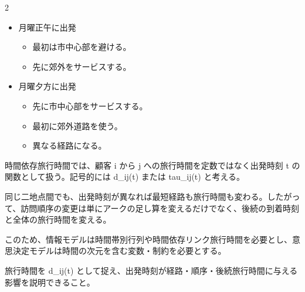 

\vspace{1.5mm}

\begin{multicols}{2}

\footnotesize

\raggedcolumns


\begin{itemize}
\item 月曜正午に出発
\begin{itemize}
\item 最初は市中心部を避ける。
\item 先に郊外をサービスする。
\end{itemize}
\item 月曜夕方に出発
\begin{itemize}
\item 先に市中心部をサービスする。
\item 最初に郊外道路を使う。
\item 異なる経路になる。
\end{itemize}
\end{itemize}

時間依存旅行時間では、顧客 i から j への旅行時間を定数ではなく出発時刻 t の関数として扱う。記号的には d\_ij(t) または tau\_ij(t) と考える。\par

同じ二地点間でも、出発時刻が異なれば最短経路も旅行時間も変わる。したがって、訪問順序の変更は単にアークの足し算を変えるだけでなく、後続の到着時刻と全体の旅行時間を変える。\par

このため、情報モデルは時間帯別行列や時間依存リンク旅行時間を必要とし、意思決定モデルは時間の次元を含む変数・制約を必要とする。\par

旅行時間を d\_ij(t) として捉え、出発時刻が経路・順序・後続旅行時間に与える影響を説明できること。\par


\end{multicols}
